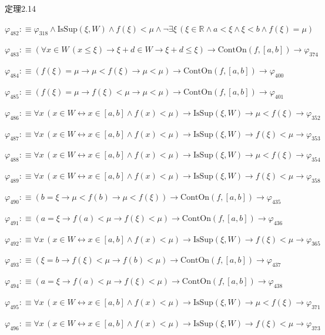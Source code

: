 \begin{fullproof}{定理2.14}
\begin{abbrevlist}
\item $\varphi_{482} :\equiv \varphi_{318} \land \mathrm{IsSup}(\xi,W) \land f(\xi) < \mu \land \neg \exists \xi\,(\xi \in \mathbb{R} \land a < \xi \land \xi < b \land f(\xi) = \mu)$
\item $\varphi_{483} :\equiv (\forall x \in W\,(x \leq \xi) \to \xi + d \in W \to \xi + d \leq \xi) \to \mathrm{ContOn}(f,[a,b]) \to \varphi_{374}$
\item $\varphi_{484} :\equiv (f(\xi) = \mu \to \mu < f(\xi) \to \mu < \mu) \to \mathrm{ContOn}(f,[a,b]) \to \varphi_{400}$
\item $\varphi_{485} :\equiv (f(\xi) = \mu \to f(\xi) < \mu \to \mu < \mu) \to \mathrm{ContOn}(f,[a,b]) \to \varphi_{401}$
\item $\varphi_{486} :\equiv \forall x\,(x \in W \leftrightarrow x \in [a,b] \land f(x) < \mu) \to \mathrm{IsSup}(\xi,W) \to \mu < f(\xi) \to \varphi_{352}$
\item $\varphi_{487} :\equiv \forall x\,(x \in W \leftrightarrow x \in [a,b] \land f(x) < \mu) \to \mathrm{IsSup}(\xi,W) \to f(\xi) < \mu \to \varphi_{353}$
\item $\varphi_{488} :\equiv \forall x\,(x \in W \leftrightarrow x \in [a,b] \land f(x) < \mu) \to \mathrm{IsSup}(\xi,W) \to \mu < f(\xi) \to \varphi_{354}$
\item $\varphi_{489} :\equiv \forall x\,(x \in W \leftrightarrow x \in [a,b] \land f(x) < \mu) \to \mathrm{IsSup}(\xi,W) \to f(\xi) < \mu \to \varphi_{358}$
\item $\varphi_{490} :\equiv (b = \xi \to \mu < f(b) \to \mu < f(\xi)) \to \mathrm{ContOn}(f,[a,b]) \to \varphi_{435}$
\item $\varphi_{491} :\equiv (a = \xi \to f(a) < \mu \to f(\xi) < \mu) \to \mathrm{ContOn}(f,[a,b]) \to \varphi_{436}$
\item $\varphi_{492} :\equiv \forall x\,(x \in W \leftrightarrow x \in [a,b] \land f(x) < \mu) \to \mathrm{IsSup}(\xi,W) \to f(\xi) < \mu \to \varphi_{365}$
\item $\varphi_{493} :\equiv (\xi = b \to f(\xi) < \mu \to f(b) < \mu) \to \mathrm{ContOn}(f,[a,b]) \to \varphi_{437}$
\item $\varphi_{494} :\equiv (a = \xi \to f(a) < \mu \to f(\xi) < \mu) \to \mathrm{ContOn}(f,[a,b]) \to \varphi_{438}$
\item $\varphi_{495} :\equiv \forall x\,(x \in W \leftrightarrow x \in [a,b] \land f(x) < \mu) \to \mathrm{IsSup}(\xi,W) \to \mu < f(\xi) \to \varphi_{371}$
\item $\varphi_{496} :\equiv \forall x\,(x \in W \leftrightarrow x \in [a,b] \land f(x) < \mu) \to \mathrm{IsSup}(\xi,W) \to f(\xi) < \mu \to \varphi_{373}$

\end{abbrevlist}
\end{fullproof}
